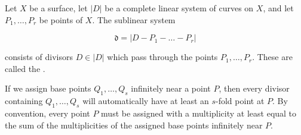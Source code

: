 Let $X$ be a surface, let $|D|$ be a complete linear system of curves on $X$, and let $P_1, \ldots, P_r$ be points of $X$. The sublinear system

$$\mathfrak{d} = |D - P_1 - \ldots - P_r|$$

consists of divisors $D \in |D|$ which pass through the points $P_1, \ldots, P_r$. These are called the .

If we assign base points $Q_1, \ldots, Q_s$ infinitely near a point $P$, then every divisor containing $Q_1, \ldots, Q_s$ will automatically have at least an $s$-fold point at $P$. By convention, every point $P$ must be assigned with a multiplicity at least equal to the sum of the multiplicities of the assigned base points infinitely near $P$.
